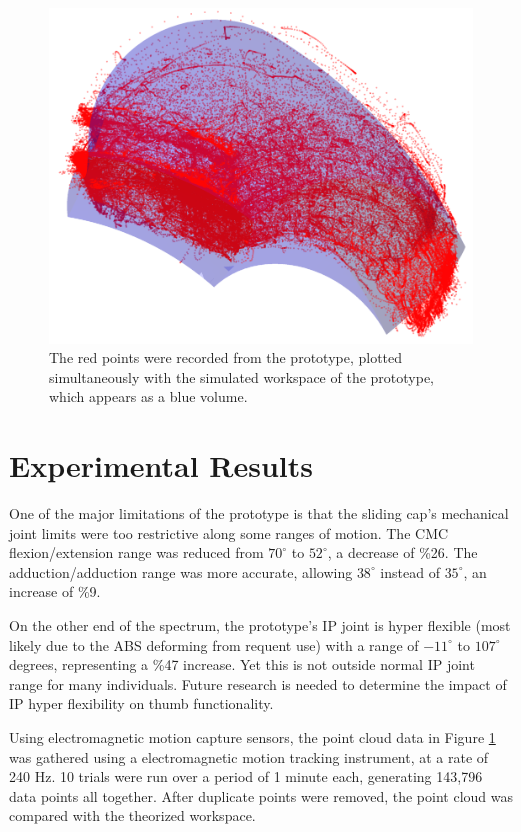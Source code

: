 \documentclass[letterpaper, 10 pt, conference]{ieeeconf}  %
\newcommand{\rFig}[1]{Figure \ref{#1}}
\begin{document}
\begin{figure}
	\centering
	\includegraphics[width = 1\columnwidth]{data}
	\caption{The red points were recorded from the prototype, plotted simultaneously with the simulated workspace of the prototype, which appears as a blue volume.}\label{dat}
	\vspace{-15pt}
\end{figure}

\section{Experimental Results}

One of the major limitations of the prototype is that the sliding cap's mechanical joint limits were  too restrictive along some ranges of motion. The CMC flexion/extension range was reduced from $70^{\circ}$ to $52^{\circ}$, a decrease of \%26. The adduction/adduction range was more accurate, allowing $38^{\circ}$ instead of $35^{\circ}$, an increase of \%9.

On the other end of the spectrum, the prototype's IP joint is hyper flexible (most likely due to the ABS deforming from requent use) with a range of $-11^{\circ}$ to $107^{\circ}$ degrees, representing a \%47 increase. Yet this is not outside normal IP joint range for many individuals. Future research is needed to determine the impact of IP hyper flexibility on thumb functionality.

Using electromagnetic motion capture sensors, the point cloud data in \rFig{dat} was gathered using a electromagnetic motion tracking instrument, at a rate of 240 Hz. 10 trials were run over a period of 1 minute each, generating 143,796 data points all together. After duplicate points were removed, the point cloud was compared with the theorized workspace. 
\end{document}
